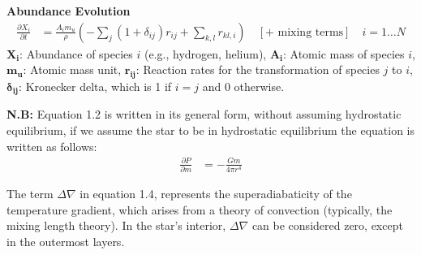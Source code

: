 \vspace{1em}
\noindent
\textbf{Abundance Evolution}
\begin{align*}
\frac{\partial X_i}{\partial t} &= \frac{A_i m_u}{\rho} \left( - \sum_{j} (1 + \delta_{ij}) r_{ij} + \sum_{k,l} r_{kl,i} \right) \quad [\text{+ mixing terms}] \quad i=1 \ldots N \tag{2.5}
\end{align*}
\(\mathbf{X_i}\): Abundance of species \(i\) (e.g., hydrogen, helium), \(\mathbf{A_i}\): Atomic mass of species \(i\), \(\mathbf{m_u}\): Atomic mass unit, \(\mathbf{r_{ij}}\): Reaction rates for the transformation of species \(j\) to \(i\), \(\mathbf{\delta_{ij}}\): Kronecker delta, which is 1 if \(i = j\) and 0 otherwise.

\vspace{1em}
\noindent
\textbf{N.B:} Equation 1.2 is written in its general form, without assuming hydrostatic equilibrium, if we assume the star to be in hydrostatic equilibrium the equation is written as follows: 
\begin{align*}
\frac{\partial P}{\partial m} &= -\frac{G m}{4\pi r^4}  \tag{2.6}
\end{align*}

\noindent
The term $\Delta \nabla$ in equation 1.4, represents the superadiabaticity of the temperature gradient, which arises from a theory of convection (typically, the mixing length theory). In the star’s interior,  $\Delta \nabla$ can be considered zero, except in the outermost layers.
